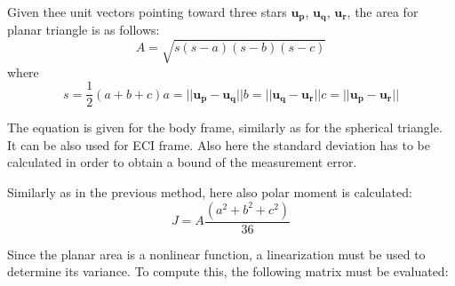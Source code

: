 \documentclass[12pt,a4paper,twoside]{article}
\begin{document}
Given thee unit vectors pointing toward three stars $\bm{u_p}$, $\bm{u_q}$, $\bm{u_r}$, the area for planar triangle is as follows:
\begin{equation}
A = \sqrt{s(s-a)(s-b)(s-c)}
\end{equation}
where
\begin{subequations}
\begin{equation}
s = \frac{1}{2}(a + b + c)
\end{equation}
\begin{equation}
a = ||\bm{u_p} - \bm{u_q}||
\end{equation}
\begin{equation}
b = ||\bm{u_q} - \bm{u_r}||
\end{equation}
\begin{equation}
c = ||\bm{u_p} - \bm{u_r}||
\end{equation}
\end{subequations}

The equation is given for the body frame, similarly as for the spherical triangle. It can be also used for ECI frame. Also here the standard deviation has to be calculated in order to obtain a bound of the measurement error.

Similarly as in the previous method, here also polar moment is calculated:
\begin{equation}
J = A\frac{(a^2 + b^2 + c^2)}{36}
\end{equation}

Since the planar area is a nonlinear function, a linearization must be used to determine its variance. To compute this, the following matrix must be evaluated:
\end{document}

